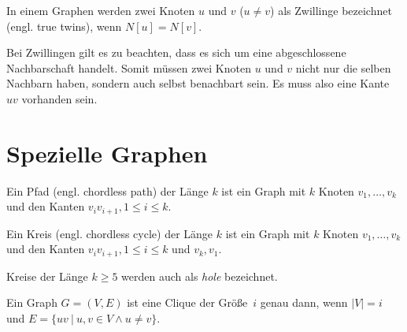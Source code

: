 \begin{mydef}[Zwillinge]
In einem Graphen werden zwei Knoten $u$ und $v$ ($u\neq v$) als Zwillinge bezeichnet (engl. true twins), wenn $N[u]=N[v]$.
\end{mydef}

Bei Zwillingen gilt es zu beachten, dass es sich um eine abgeschlossene Nachbarschaft handelt. Somit müssen zwei Knoten $u$ und $v$ nicht nur die selben Nachbarn haben, sondern auch selbst benachbart sein. Es muss also eine Kante $uv$ vorhanden sein.


\section{Spezielle Graphen}
\begin{mydef}[Pfad, $P_k$]Ein Pfad (engl. chordless path) der Länge $k$ ist ein Graph mit $k$ Knoten $v_1, \ldots, v_k$ und den Kanten $v_iv_{i+1}, 1 \leq i \leq k$.
\end{mydef}

\begin{mydef}[Kreis, $C_k$]Ein Kreis (engl. chordless cycle) der Länge $k$ ist ein Graph mit $k$ Knoten $v_1, \ldots, v_k$ und den Kanten $v_iv_{i+1}, 1 \leq i \leq k$ und $v_k,v_1$.

Kreise der Länge $k\geq 5$ werden auch als \emph{hole} bezeichnet.
\end{mydef}

\begin{mydef}[Clique, $K_i$]Ein Graph $G=(V,E)$ ist eine Clique der Größe~$i$ 
genau dann, wenn $|V|=i$ und $E=\{uv \ |\ u,v \in V \wedge u \neq v\}$.
\end{mydef}

